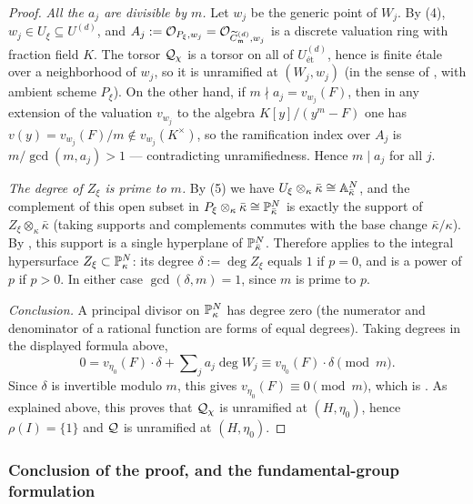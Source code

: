 \begin{proof}
    \emph{All the $a_j$ are divisible by $m$.} Let $w_j$ be the generic point of $W_j$. By
    (4), $w_j \in U_\xi \subseteq U^{(d)}$, and
    $A_j := \mathcal{O}_{P_\xi, w_j} = \mathcal{O}_{\widetilde{C}_{\mathfrak{m}}^{(d)}, w_j}$ is a discrete valuation ring with fraction
    field $K$. The torsor $\mathcal{Q}_\chi$ is a torsor on all of $U^{(d)}_{\text{\'et}}$, hence is
    finite \'etale over a neighborhood of $w_j$, so it is unramified at $(W_j, w_j)$ (in the
    sense of , with ambient scheme $P_\xi$). On
    the other hand, if $m \nmid a_j = v_{w_j}(F)$, then in any extension of the valuation
    $v_{w_j}$ to the algebra $K[y]/(y^m - F)$ one has
    $v(y) = v_{w_j}(F)/m \notin v_{w_j}(K^\times)$, so the ramification index over $A_j$ is
    $m/\gcd(m, a_j) > 1$ --- contradicting unramifiedness. Hence $m \mid a_j$ for all $j$.

    \emph{The degree of $Z_\xi$ is prime to $m$.} By
    (5) we have
    $U_\xi \otimes_\kappa \bar{\kappa} \cong \mathbb{A}^N_{\bar\kappa}$, and the complement of this
    open subset in $P_\xi \otimes_\kappa \bar{\kappa} \cong \mathbb{P}^N_{\bar\kappa}$ is exactly the
    support of $Z_\xi \otimes_\kappa \bar{\kappa}$ (taking supports and complements commutes
    with the base change $\bar\kappa/\kappa$). By ,
    this support is a single hyperplane of $\mathbb{P}^N_{\bar\kappa}$. Therefore
     applies to the integral hypersurface
    $Z_\xi \subset \mathbb{P}^N_\kappa$: its degree $\delta := \deg Z_\xi$ equals $1$ if $p = 0$, and
    is a power of $p$ if $p > 0$. In either case $\gcd(\delta, m) = 1$, since $m$ is prime to
    $p$.

    \emph{Conclusion.} A principal divisor on $\mathbb{P}^N_\kappa$ has degree zero (the numerator
    and denominator of a rational function are forms of equal degrees). Taking degrees in the
    displayed formula above,
    \[ 0 = v_{\eta_0}(F)\cdot \delta + \sum\nolimits_j a_j \deg W_j
         \equiv v_{\eta_0}(F) \cdot \delta \pmod{m}. \]
    Since $\delta$ is invertible modulo $m$, this gives
    $v_{\eta_0}(F) \equiv 0 \pmod{m}$, which is
    . As explained above, this proves that
    $\mathcal{Q}_\chi$ is unramified at $(H, \eta_0)$, hence $\rho(I) = \{1\}$ and $\mathcal{Q}$ is unramified
    at $(H, \eta_0)$.
\end{proof}

\subsubsection*{Conclusion of the proof, and the fundamental-group formulation}

